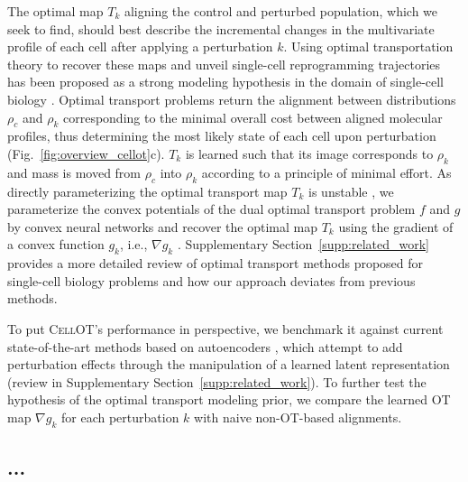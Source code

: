  The optimal map $T_k$ aligning the control and perturbed population, which we seek to find, should best describe the incremental changes in the multivariate profile of each cell after applying a perturbation $k$. Using optimal transportation theory \citep{villani2021topics, santambrogio2015optimal} to recover these maps and unveil single-cell reprogramming trajectories has been proposed as a strong modeling hypothesis in the domain of single-cell biology \citep{schiebinger2019optimal, cang2020inferring, demetci2020gromov, huizing2021optimal, lavenant2021towards, zhang2021optimal}.
Optimal transport problems return the alignment between distributions $\rho_c$ and $\rho_k$ corresponding to the minimal overall cost between aligned molecular profiles, thus determining the most likely state of each cell upon perturbation (Fig.~\ref{fig:overview_cellot}c).
$T_k$ is learned such that its image corresponds to $\rho_k$ and mass is moved from $\rho_c$ into $\rho_k$ according to a principle of minimal effort.
As directly parameterizing the optimal transport map $T_k$ \citep{korotin2021wasserstein, yang2018scalable, prasad2020optimal} is unstable \citep[Table 1]{makkuva2020optimal}, we parameterize the convex potentials of the dual optimal transport problem $f$ and $g$ by convex neural networks \citep{amos2017input} and recover the optimal map $T_k$ using the gradient of a convex function $g_k$, i.e., $\nabla g_k$ \citep{makkuva2020optimal}.
Supplementary Section~\ref{supp:related_work} provides a more detailed review of optimal transport methods proposed for single-cell biology problems and how our approach deviates from previous methods.

To put \textsc{CellOT}'s performance in perspective, we benchmark it against current state-of-the-art methods based on autoencoders \citep{lotfollahi2019scgen, Lopez2018scvi}, which attempt to add perturbation effects through the manipulation of a learned latent representation (review in Supplementary Section~\ref{supp:related_work}).
To further test the hypothesis of the optimal transport modeling prior, we compare the learned OT map $\nabla g_k$ for each perturbation $k$ with naive non-OT-based alignments.




\subsection{...}

